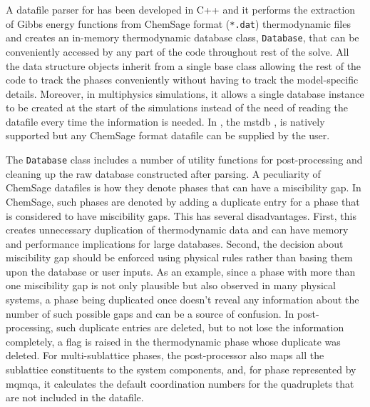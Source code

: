 	A datafile parser for {\GEM} has been developed in C++ and it performs the extraction of Gibbs energy functions from ChemSage format (\texttt{*.dat}) thermodynamic files and creates an in-memory thermodynamic database class, \texttt{Database}, that can be conveniently accessed by any part of the code throughout rest of the solve. All the data structure objects inherit from a single base class allowing the rest of the code to track the phases conveniently without having to track the model-specific  details. Moreover, in multiphysics simulations, it allows a single database instance to be created at the start of the simulations instead of the need of reading the datafile every time the information is needed. In {\GEM}, the \gls{mstdb} \cite{Besmann:2021aa,Ard:2022aa}, is natively supported but any ChemSage format datafile can be supplied by the user.
	
	The \texttt{Database} class includes a number of utility functions for post-processing and cleaning up the raw database constructed after parsing. A peculiarity of ChemSage datafiles is how they denote phases that can have a miscibility gap. In ChemSage, such phases are denoted by adding a duplicate entry for a phase that is considered to have miscibility gaps. This has several disadvantages. First, this creates unnecessary duplication of thermodynamic data and can have memory and performance implications for large databases. Second, the decision about miscibility gap should be enforced using physical rules rather than basing them upon the database or user inputs. As an example, since a phase with more than one miscibility gap is not only plausible but also observed in many physical systems, a phase being duplicated once doesn't reveal any information about the number of such possible gaps and can be a source of confusion. In post-processing, such duplicate entries are deleted, but to not lose the information completely, a flag is raised in the thermodynamic phase whose duplicate was deleted. For multi-sublattice phases, the post-processor also maps all the sublattice constituents to the system components, and, for phase represented by \gls{mqmqa}, it calculates the default coordination numbers for the quadruplets that are not included in the datafile.
	
